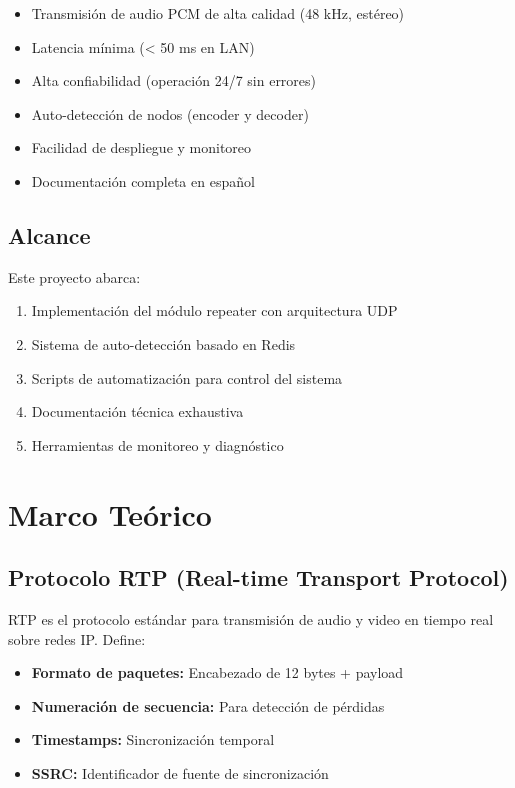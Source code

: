 \documentclass[12pt,a4paper]{article}
\begin{document}
\begin{itemize}[itemsep=0.5em]
    \item Transmisión de audio PCM de alta calidad (48 kHz, estéreo)
    \item Latencia mínima (< 50 ms en LAN)
    \item Alta confiabilidad (operación 24/7 sin errores)
    \item Auto-detección de nodos (encoder y decoder)
    \item Facilidad de despliegue y monitoreo
    \item Documentación completa en español
\end{itemize}

\subsection{Alcance}

Este proyecto abarca:

\begin{enumerate}[itemsep=0.5em]
    \item Implementación del módulo repeater con arquitectura UDP
    \item Sistema de auto-detección basado en Redis
    \item Scripts de automatización para control del sistema
    \item Documentación técnica exhaustiva
    \item Herramientas de monitoreo y diagnóstico
\end{enumerate}

\newpage

\section{Marco Teórico}

\subsection{Protocolo RTP (Real-time Transport Protocol)}

RTP es el protocolo estándar para transmisión de audio y video en tiempo real sobre redes IP. Define:

\begin{itemize}
    \item \textbf{Formato de paquetes:} Encabezado de 12 bytes + payload
    \item \textbf{Numeración de secuencia:} Para detección de pérdidas
    \item \textbf{Timestamps:} Sincronización temporal
    \item \textbf{SSRC:} Identificador de fuente de sincronización
\end{itemize}
\end{document}
